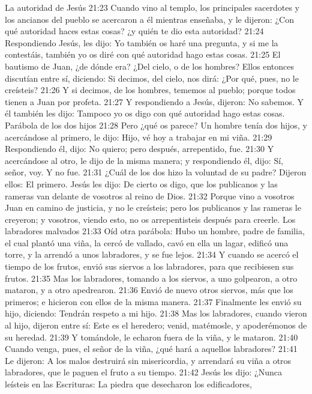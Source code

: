 La autoridad de Jesús  
21:23 Cuando vino al templo, los principales sacerdotes y los ancianos del pueblo se acercaron a él mientras enseñaba, y le dijeron: ¿Con qué autoridad haces estas cosas? ¿y quién te dio esta autoridad? 
21:24 Respondiendo Jesús, les dijo: Yo también os haré una pregunta, y si me la contestáis, también yo os diré con qué autoridad hago estas cosas. 
21:25 El bautismo de Juan, ¿de dónde era? ¿Del cielo, o de los hombres? Ellos entonces discutían entre sí, diciendo: Si decimos, del cielo, nos dirá: ¿Por qué, pues, no le creísteis? 
21:26 Y si decimos, de los hombres, tememos al pueblo; porque todos tienen a Juan por profeta. 
21:27 Y respondiendo a Jesús, dijeron: No sabemos. Y él también les dijo: Tampoco yo os digo con qué autoridad hago estas cosas. 
Parábola de los dos hijos 
21:28 Pero ¿qué os parece? Un hombre tenía dos hijos, y acercándose al primero, le dijo: Hijo, vé hoy a trabajar en mi viña. 
21:29 Respondiendo él, dijo: No quiero; pero después, arrepentido, fue. 
21:30 Y acercándose al otro, le dijo de la misma manera; y respondiendo él, dijo: Sí, señor, voy. Y no fue. 
21:31 ¿Cuál de los dos hizo la voluntad de su padre? Dijeron ellos: El primero. Jesús les dijo: De cierto os digo, que los publicanos y las rameras van delante de vosotros al reino de Dios. 
21:32 Porque vino a vosotros Juan en camino de justicia, y no le creísteis; pero los publicanos y las rameras le creyeron; y vosotros, viendo esto, no os arrepentisteis después para creerle. 
Los labradores malvados  
21:33 Oíd otra parábola: Hubo un hombre, padre de familia, el cual plantó una viña, la cercó de vallado, cavó en ella un lagar, edificó una torre, y la arrendó a unos labradores, y se fue lejos. 
21:34 Y cuando se acercó el tiempo de los frutos, envió sus siervos a los labradores, para que recibiesen sus frutos. 
21:35 Mas los labradores, tomando a los siervos, a uno golpearon, a otro mataron, y a otro apedrearon. 
21:36 Envió de nuevo otros siervos, más que los primeros; e hicieron con ellos de la misma manera. 
21:37 Finalmente les envió su hijo, diciendo: Tendrán respeto a mi hijo. 
21:38 Mas los labradores, cuando vieron al hijo, dijeron entre sí: Este es el heredero; venid, matémosle, y apoderémonos de su heredad. 
21:39 Y tomándole, le echaron fuera de la viña, y le mataron. 
21:40 Cuando venga, pues, el señor de la viña, ¿qué hará a aquellos labradores? 
21:41 Le dijeron: A los malos destruirá sin misericordia, y arrendará su viña a otros labradores, que le paguen el fruto a su tiempo. 
21:42 Jesús les dijo: ¿Nunca leísteis en las Escrituras: 
La piedra que desecharon los edificadores, 

